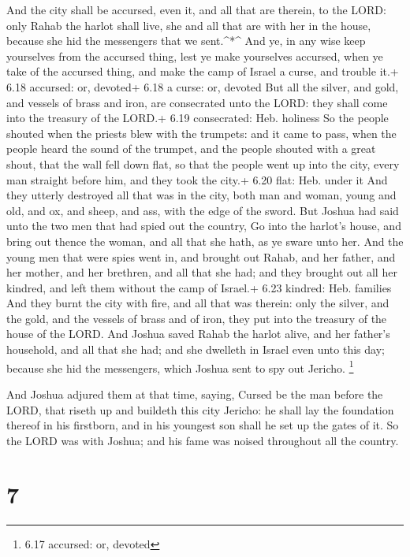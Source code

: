  And the city shall be accursed, even it, and all that are
therein, to the LORD: only Rahab the harlot shall live, she and all that
are with her in the house, because she hid the messengers that we
sent.\^{}*\^{}  And ye, in any wise keep yourselves from
the accursed thing, lest ye make yourselves accursed, when ye take of
the accursed thing, and make the camp of Israel a curse, and trouble
it.+ 6.18 accursed: or, devoted+ 6.18 a curse: or, devoted 
But all the silver, and gold, and vessels of brass and iron, are
consecrated unto the LORD: they shall come into the treasury of the
LORD.+ 6.19 consecrated: Heb. holiness  So the people
shouted when the priests blew with the trumpets: and it came to pass,
when the people heard the sound of the trumpet, and the people shouted
with a great shout, that the wall fell down flat, so that the people
went up into the city, every man straight before him, and they took the
city.+ 6.20 flat: Heb. under it  And they utterly destroyed
all that was in the city, both man and woman, young and old, and ox, and
sheep, and ass, with the edge of the sword.  But Joshua had
said unto the two men that had spied out the country, Go into the
harlot's house, and bring out thence the woman, and all that she hath,
as ye sware unto her.  And the young men that were spies
went in, and brought out Rahab, and her father, and her mother, and her
brethren, and all that she had; and they brought out all her kindred,
and left them without the camp of Israel.+ 6.23 kindred: Heb. families
 And they burnt the city with fire, and all that was
therein: only the silver, and the gold, and the vessels of brass and of
iron, they put into the treasury of the house of the LORD. 
And Joshua saved Rahab the harlot alive, and her father's household, and
all that she had; and she dwelleth in Israel even unto this day; because
she hid the messengers, which Joshua sent to spy out Jericho.
\footnote{6.17 accursed: or, devoted}

 And Joshua adjured them at that time, saying, Cursed be
the man before the LORD, that riseth up and buildeth this city Jericho:
he shall lay the foundation thereof in his firstborn, and in his
youngest son shall he set up the gates of it.  So the LORD
was with Joshua; and his fame was noised throughout all the country.

\hypertarget{section-6}{%
\section{7}\label{section-6}}

